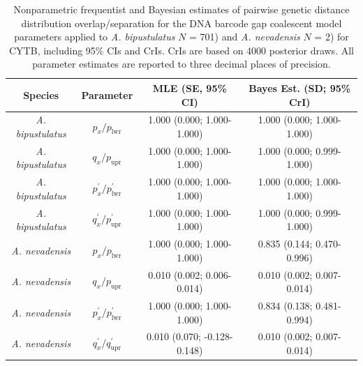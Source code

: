 \documentclass[12pt]{article}
\begin{document}
\begin{landscape}
\begin{table}[H]

\centering

\caption{Nonparametric frequentist and Bayesian estimates of pairwise genetic distance distribution overlap/separation for the DNA barcode gap coalescent model parameters applied to \textit{A. bipustulatus} $N$ = 701) and \textit{A. nevadensis} $N$ = 2) for CYTB, including 95\%  CIs and CrIs. CrIs are based on 4000 posterior draws. All parameter estimates are reported to three decimal places of precision.}

\begin{tabular}{cccc} \hline

\textbf{Species} & \textbf{Parameter} & \textbf{MLE (SE, 95\% CI)} & \textbf{Bayes Est. (SD; 95\% CrI)} \\  \hline
\textit{A. bipustulatus} & $p_x/p_\mathrm{lwr}$ & 1.000 (0.000; 1.000-1.000) & 1.000 (0.000; 1.000-1.000) \\
\textit{A. bipustulatus} & $q_x/p_\mathrm{upr}$ & 1.000 (0.000; 1.000-1.000) & 1.000 (0.000; 0.999-1.000) \\
\textit{A. bipustulatus} & $p^{'}_x/p^{'}_\mathrm{lwr}$ & 1.000 (0.000; 1.000-1.000) & 1.000 (0.000; 1.000-1.000)  \\
\textit{A. bipustulatus} & $q^{'}_x/p^{'}_\mathrm{upr}$ & 1.000 (0.000; 1.000-1.000) & 1.000 (0.000; 0.999-1.000) \\


\textit{A. nevadensis} & $p_x/p_\mathrm{lwr}$ & 1.000 (0.000; 1.000-1.000) & 0.835 (0.144; 0.470-0.996) \\
\textit{A. nevadensis} & $q_x/p_\mathrm{upr}$ & 0.010 (0.002; 0.006-0.014) & 0.010 (0.002; 0.007-0.014) \\
\textit{A. nevadensis} &  $p^{'}_x/p^{'}_\mathrm{lwr}$ & 1.000 (0.000; 1.000-1.000) & 0.834 (0.138; 0.481-0.994) \\
\textit{A. nevadensis} &  $q^{'}_x/q^{'}_\mathrm{upr}$ & 0.010 (0.070; -0.128-0.148) & 0.010 (0.002; 0.007-0.014) \\


\hline


\end{tabular}

\end{table}
\end{landscape}

\newpage
\end{document}
